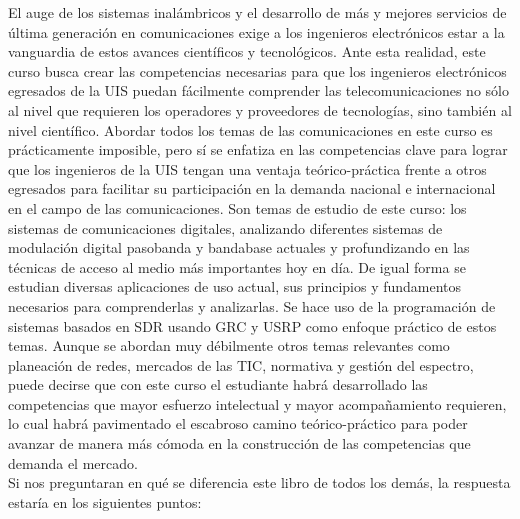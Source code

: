 El auge de los sistemas inalámbricos y el desarrollo de más y mejores servicios de última generación en comunicaciones exige a los ingenieros electrónicos %
estar a la vanguardia de estos avances científicos y tecnológicos. Ante esta realidad, este curso busca crear las competencias necesarias para que los ingenieros electrónicos egresados de la UIS 
puedan fácilmente comprender las telecomunicaciones no sólo al nivel que requieren los operadores y proveedores de tecnologías, sino también al nivel científico. Abordar todos los temas de las comunicaciones en este curso %
es prácticamente imposible, pero sí se enfatiza en las competencias clave para lograr que los ingenieros de la UIS tengan una ventaja teórico-práctica frente a otros egresados para facilitar su participación en la demanda nacional e internacional en el campo de las comunicaciones. %
Son temas de estudio de este curso: 
los sistemas de comunicaciones digitales, analizando diferentes sistemas de modulación digital pasobanda y bandabase actuales y profundizando en las técnicas de acceso al medio más importantes hoy en día. De igual forma se estudian diversas aplicaciones de uso actual, sus principios y fundamentos necesarios para comprenderlas y analizarlas. Se hace uso de la programación de sistemas basados en SDR usando GRC y USRP como enfoque práctico de estos temas.
Aunque se abordan muy débilmente otros temas relevantes como planeación de redes, mercados de las TIC, normativa y gestión del espectro, puede decirse que con este curso %
el estudiante habrá desarrollado las competencias que mayor esfuerzo intelectual y mayor acompañamiento requieren, lo cual habrá pavimentado el escabroso camino teórico-práctico para poder avanzar de manera más cómoda en la construcción de las competencias que demanda el mercado.\\ %

Si nos preguntaran en qué se diferencia este libro de todos los demás, la respuesta estaría en los siguientes puntos:\\ 

